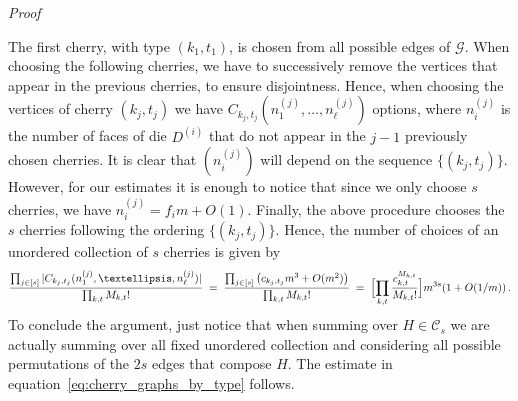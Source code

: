 \documentclass[reqno,a4paper,11pt]{amsart}
\makeatletter
\theoremstyle{remark}
\newcommand{\mc}[1]{{\mathcal #1}}
\numberwithin{equation}{section}
\renewenvironment{proof}[1][Proof]{\par
\pushQED{\qed}%
\normalfont \topsep6\p@\@plus6\p@\relax
\trivlist
\item\relax
{\itshape
#1\@addpunct{.}}\hspace\labelsep\ignorespaces
}{%
\popQED\endtrivlist\@endpefalse
}
\makeatother
\begin{document}
\begin{proof}
The first cherry, with type $(k_1,t_1)$, is chosen from
all possible edges of $\mc G$. When choosing the following cherries, we have
to successively remove the vertices that appear in the previous cherries, to
ensure disjointness. Hence, when choosing the vertices of cherry $(k_j,t_j)$
we have $C_{k_j,t_j}(n^{(j)}_1, \ldots, n^{(j)}_\ell)$ options, where $n^{(j)}_i$
is the number of faces of die $D^{(i)}$ that do not appear in the $j-1$
previously chosen cherries. It is clear that $(n^{(j)}_i)$ will depend on
the sequence $\{(k_j, t_j)\}$. However, for our estimates it is enough to
notice that since we only choose $s$ cherries, we have $n^{(j)}_i = f_i m+O(1)$.
Finally, the above procedure chooses the $s$ cherries following the ordering
$\{(k_j, t_j)\}$. Hence, the number of choices of an unordered collection of
$s$ cherries is given by
\begin{equation*}
\frac{\prod_{j \in [s]} |C_{k_j, t_j}(n^{(j)}_1, \ldots, n^{(j)}_\ell)|}
    {\prod_{k,t} M_{k,t}!}
    \;=\;
\frac{\prod_{j \in [s]} \left(c_{k_j, t_j} m^3+O(m^2)\right)}
    {\prod_{k,t} M_{k,t}!}
    \;=\; \Bigl[ \prod_{k,t} \frac{c_{k,t}^{M_{k,t}}}{M_{k,t}!}\Bigr] m^{3s}(1+O(1/m))\,.
\end{equation*}
To conclude the argument, just notice that when summing over $H \in \mc C_s$
we are actually summing over all fixed unordered collection and considering all
possible permutations of the $2s$ edges that compose $H$. The estimate in
equation~\eqref{eq:cherry_graphs_by_type} follows.
\end{proof}
\end{document}
